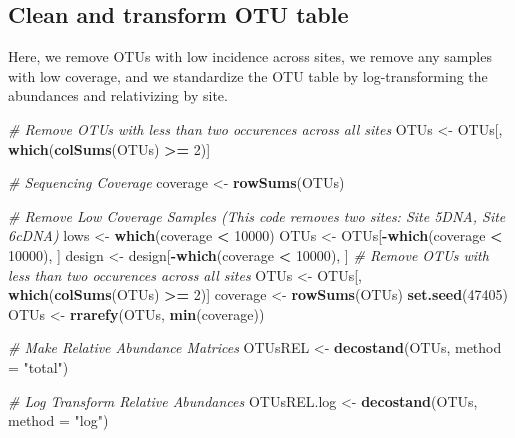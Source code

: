 \documentclass[]{article}
\newenvironment{Shaded}{\begin{snugshade}}{\end{snugshade}}
\newcommand{\KeywordTok}[1]{\textcolor[rgb]{0.13,0.29,0.53}{\textbf{#1}}}
\newcommand{\DataTypeTok}[1]{\textcolor[rgb]{0.13,0.29,0.53}{#1}}
\newcommand{\DecValTok}[1]{\textcolor[rgb]{0.00,0.00,0.81}{#1}}
\newcommand{\StringTok}[1]{\textcolor[rgb]{0.31,0.60,0.02}{#1}}
\newcommand{\CommentTok}[1]{\textcolor[rgb]{0.56,0.35,0.01}{\textit{#1}}}
\newcommand{\OperatorTok}[1]{\textcolor[rgb]{0.81,0.36,0.00}{\textbf{#1}}}
\newcommand{\NormalTok}[1]{#1}
\begin{document}
\subsection{Clean and transform OTU
table}\label{clean-and-transform-otu-table}

Here, we remove OTUs with low incidence across sites, we remove any
samples with low coverage, and we standardize the OTU table by
log-transforming the abundances and relativizing by site.

\begin{Shaded}
\begin{Highlighting}[]
\CommentTok{# Remove OTUs with less than two occurences across all sites}
\NormalTok{OTUs <-}\StringTok{ }\NormalTok{OTUs[, }\KeywordTok{which}\NormalTok{(}\KeywordTok{colSums}\NormalTok{(OTUs) }\OperatorTok{>=}\StringTok{ }\DecValTok{2}\NormalTok{)]}

\CommentTok{# Sequencing Coverage}
\NormalTok{coverage <-}\StringTok{ }\KeywordTok{rowSums}\NormalTok{(OTUs)}

\CommentTok{# Remove Low Coverage Samples (This code removes two sites: Site 5DNA, Site 6cDNA)}
\NormalTok{lows <-}\StringTok{ }\KeywordTok{which}\NormalTok{(coverage }\OperatorTok{<}\StringTok{ }\DecValTok{10000}\NormalTok{)}
\NormalTok{OTUs <-}\StringTok{ }\NormalTok{OTUs[}\OperatorTok{-}\KeywordTok{which}\NormalTok{(coverage }\OperatorTok{<}\StringTok{ }\DecValTok{10000}\NormalTok{), ]}
\NormalTok{design <-}\StringTok{ }\NormalTok{design[}\OperatorTok{-}\KeywordTok{which}\NormalTok{(coverage }\OperatorTok{<}\StringTok{ }\DecValTok{10000}\NormalTok{), ]}
\CommentTok{# Remove OTUs with less than two occurences across all sites}
\NormalTok{OTUs <-}\StringTok{ }\NormalTok{OTUs[, }\KeywordTok{which}\NormalTok{(}\KeywordTok{colSums}\NormalTok{(OTUs) }\OperatorTok{>=}\StringTok{ }\DecValTok{2}\NormalTok{)]}
\NormalTok{coverage <-}\StringTok{ }\KeywordTok{rowSums}\NormalTok{(OTUs)}
\KeywordTok{set.seed}\NormalTok{(}\DecValTok{47405}\NormalTok{)}
\NormalTok{OTUs <-}\StringTok{ }\KeywordTok{rrarefy}\NormalTok{(OTUs, }\KeywordTok{min}\NormalTok{(coverage))}

\CommentTok{# Make Relative Abundance Matrices}
\NormalTok{OTUsREL <-}\StringTok{ }\KeywordTok{decostand}\NormalTok{(OTUs, }\DataTypeTok{method =} \StringTok{"total"}\NormalTok{)}

\CommentTok{# Log Transform Relative Abundances}
\NormalTok{OTUsREL.log <-}\StringTok{ }\KeywordTok{decostand}\NormalTok{(OTUs, }\DataTypeTok{method =} \StringTok{"log"}\NormalTok{)}
\end{Highlighting}
\end{Shaded}
\end{document}
